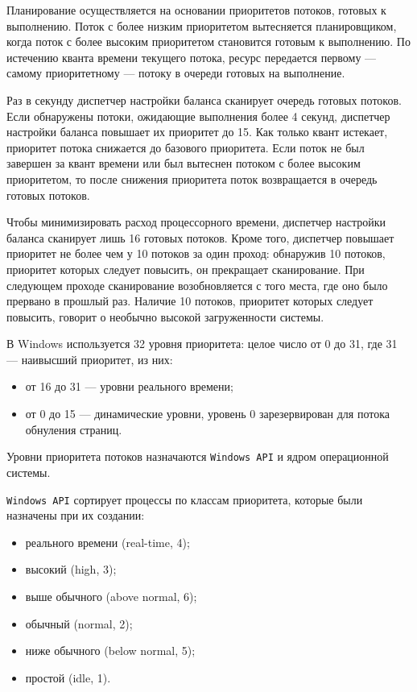 Планирование осуществляется на основании приоритетов потоков, готовых к выполнению. Поток с более низким приоритетом вытесняется планировщиком, когда поток с более высоким приоритетом становится готовым к выполнению. По истечению кванта времени текущего потока, ресурс передается первому --- самому приоритетному --- потоку в очереди готовых на выполнение.

Раз в секунду диспетчер настройки баланса сканирует очередь готовых потоков. Если обнаружены потоки, ожидающие выполнения более 4 секунд, диспетчер настройки баланса повышает их приоритет до 15. Как только квант истекает, приоритет потока снижается до базового приоритета. Если поток не был завершен за квант времени или был вытеснен потоком с более высоким приоритетом, то после снижения приоритета поток возвращается в очередь готовых потоков.

Чтобы минимизировать расход процессорного времени, диспетчер настройки баланса сканирует лишь 16 готовых потоков. Кроме того, диспетчер повышает приоритет не более чем у 10 потоков за один проход: обнаружив 10 потоков, приоритет которых следует повысить, он прекращает сканирование. При следующем проходе сканирование возобновляется с того места, где оно было прервано в прошлый раз. Наличие 10 потоков, приоритет которых следует повысить, говорит о необычно высокой загруженности системы.


В Windows используется 32 уровня приоритета: целое число от 0 до 31, где 31 --- наивысший приоритет, из них:
\begin{itemize}
    \item от 16 до 31 --- уровни реального времени;
    \item от 0 до 15 --- динамические уровни, уровень 0 зарезервирован для потока обнуления страниц.
\end{itemize}

Уровни приоритета потоков назначаются \texttt{Windows API} и ядром операционной системы.

\texttt{Windows API} сортирует процессы по классам приоритета, которые были назначены при их создании:
\begin{itemize}
    \item реального времени (real-time, 4);
    \item высокий (high, 3);
    \item выше обычного (above normal, 6);
    \item обычный (normal, 2);
    \item ниже обычного (below normal, 5);
    \item простой (idle, 1).
\end{itemize}

